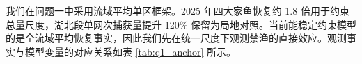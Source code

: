 我们在问题一中采用流域平均单区框架。2025 年四大家鱼恢复约 1.8 倍用于约束总量尺度，湖北段单网次捕获量提升 120\% 保留为局地对照。当前能稳定约束模型的是全流域平均恢复事实，因此我们先在统一尺度下观测禁渔的直接效应。观测事实与模型变量的对应关系如表 \ref{tab:q1_anchor} 所示。
